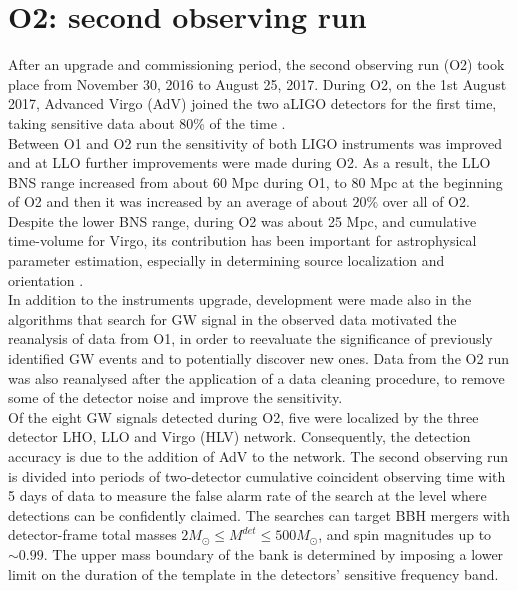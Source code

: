 \documentclass[binding=0.6cm, LaM]{sapthesis}
\begin{document}
\begin{figure}[H]
                         \label{fig:o1}
                \end{figure}


\section{O2: second observing run}

	After an upgrade and commissioning period, the second observing run (O2) took place from November 30, 2016 to August 25, 2017. 
	During O2, on the 1st August 2017, Advanced Virgo (AdV) joined the two aLIGO detectors for the first time, 
	taking sensitive data about 80\% of the time \cite{13}.  \\
	Between O1 and O2 run the sensitivity of both LIGO instruments was improved and 
	at LLO further improvements were made during O2. 
	As a result, the LLO BNS range increased from about 60 Mpc during O1, 
	to 80 Mpc at the beginning of O2 and then it was increased 
	by an average of about $20\%$ over all of O2. 
 	Despite the lower BNS range, during O2 was about 25 Mpc, 
	and cumulative time-volume for Virgo, its contribution has been important 
	for astrophysical parameter estimation, especially in determining source localization and orientation \cite{56}. \\
	In addition to the instruments upgrade, development were made also
	in the algorithms that search for GW signal in the observed data motivated the reanalysis of data from O1, 
	in order to reevaluate the significance of previously identified GW events and to potentially discover new ones. 
	Data from the O2 run was also reanalysed after the application of a data cleaning procedure, 
	to remove some of the detector noise and improve the sensitivity. \\
	Of the eight GW signals detected during O2, five were localized by the three detector LHO, LLO and Virgo (HLV) network. 
	Consequently, the detection accuracy is  due to the addition of AdV to the network. 
	The second observing run is divided into periods of two-detector cumulative 
	coincident observing time with 5 days of data to measure the false alarm rate 
	of the search at the level where detections can be confidently claimed. 
	The searches can target BBH mergers with detector-frame total masses $2M_\odot \leq M^{det} \leq 500 M_\odot$,
	and spin magnitudes up to $\sim0.99$.
	The upper mass boundary of the bank is determined by imposing a lower limit on the duration of the template in the detectors’ sensitive frequency band.
\end{document}
